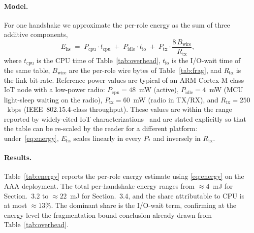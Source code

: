 \documentclass{easychair}
\newcommand{\VarSecShort}[1]{Section.~#1}
\begin{document}
\paragraph{Model.} For one handshake we approximate the per-role
energy as the sum of three additive components,
\begin{equation}
E_{\mathrm{hs}} \;=\; P_{\mathrm{cpu}}\cdot t_{\mathrm{cpu}}
\;+\; P_{\mathrm{idle}}\cdot t_{\mathrm{io}}
\;+\; P_{\mathrm{tx}}\cdot \frac{8\,B_{\mathrm{wire}}}{R_{\mathrm{tx}}},
\label{eq:energy}
\end{equation}
where $t_{\mathrm{cpu}}$ is the CPU time of
Table~\ref{tab:overhead}, $t_{\mathrm{io}}$ is the I/O-wait time of
the same table, $B_{\mathrm{wire}}$ are the per-role wire bytes of
Table~\ref{tab:frag}, and $R_{\mathrm{tx}}$ is the link bit-rate.
Reference power values are typical of an ARM Cortex-M class IoT node
with a low-power radio:
$P_{\mathrm{cpu}}\!=\!48$~mW (active),
$P_{\mathrm{idle}}\!=\!4$~mW (MCU light-sleep waiting on the radio),
$P_{\mathrm{tx}}\!=\!60$~mW (radio in TX/RX), and
$R_{\mathrm{tx}}\!=\!250$~kbps (IEEE~802.15.4-class throughput).
These values are within the range reported by widely-cited IoT
characterizations~\cite{FVW24,FTK+25} and are stated explicitly so
that the table can be re-scaled by the reader for a different
platform: under~\eqref{eq:energy}, $E_{\mathrm{hs}}$ scales linearly
in every $P_*$ and inversely in $R_{\mathrm{tx}}$.

\paragraph{Results.} Table~\ref{tab:energy} reports the per-role
energy estimate using \eqref{eq:energy} on the AAA deployment. The
total per-handshake energy ranges from $\approx\!4$~mJ for
\VarSecShort{3.2} to $\approx\!22$~mJ for \VarSecShort{3.4}, and the
share attributable to CPU is at most $\approx\!13\%$. The dominant
share is the I/O-wait term, confirming at the energy level the
fragmentation-bound conclusion already drawn from
Table~\ref{tab:overhead}.
\end{document}
